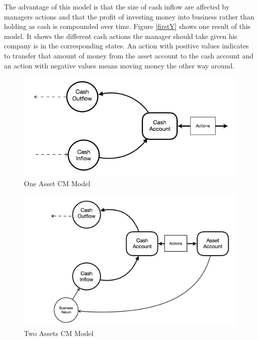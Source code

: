 \documentclass[12pt]{article}
\begin{document}
The advantage of this model is that the size of cash inflow are affected by managers actions and that the profit of investing money into business rather than holding as cash is compounded over time. Figure \ref{firstY} shows one result of this model. It shows the different cash actions the manager should take given his company is in the corresponding states. An action with positive values indicates to transfer that amount of money from the asset account to the cash account and an action with negative values means moving money the other way around. 



\begin{figure}
\begin{center}
\includegraphics[scale=.4]{basicModel}
\end{center}
\caption{One Asset CM Model}
\label{basic model}
\end{figure}

\begin{figure}
\begin{center}
\includegraphics[scale=.35]{twoAssets}
\end{center}
\caption{Two Assets CM Model}
\label{twoAsset}
\end{figure}
\end{document}
